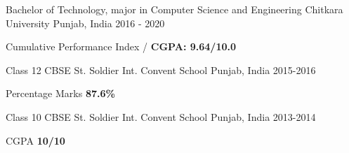 


\begin{cventries}


\cventry
{Bachelor of Technology, major in Computer Science and Engineering} %
{Chitkara University} %
{Punjab, India} %
{2016 - 2020} %
{%
\begin{cvitems}
\item {Cumulative Performance Index /
    \textbf{CGPA: 9.64/10.0}}
\end{cvitems}
}


\cventry
{Class 12 CBSE} %
{St. Soldier Int. Convent School} %
{Punjab, India} %
{2015-2016} %
{%
\begin{cvitems}
\item {Percentage Marks\textbf{ 87.6\% }}
\end{cvitems}
}


\cventry
{Class 10 CBSE} %
{St. Soldier Int. Convent School} %
{Punjab, India} %
{2013-2014} %
{%
\begin{cvitems}
\item {CGPA\textbf{ 10/10 }}
\end{cvitems}
}

\end{cventries}
